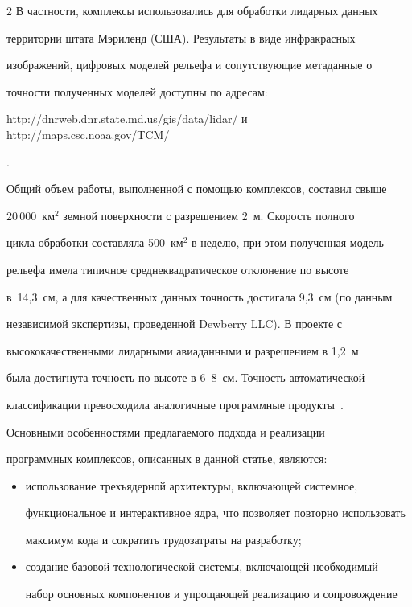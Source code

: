 \begin{multicols}{2}
   В частности, комплексы использовались для обработки лидарных данных 

территории штата Мэриленд (США). Результаты в виде инфракрасных 

изображений, цифровых моделей рель\-ефа и сопутствующие метаданные о 

точ\-ности полученных моделей доступны по адресам: {\sf 

http://dnrweb.dnr.state.md.us/gis/data/lidar/ и http://maps.csc.noaa.gov/TCM/}.



   Общий объем работы, выполненной с помощью комплексов, составил свыше 

20\,000~км$^2$ земной поверхности с разрешением 2~м. Скорость полного 

цикла обработки составляла 500~км$^2$ в неделю, при этом полученная модель 

рельефа имела типичное среднеквадратическое отклонение по высоте 

в~14,3~см, а для качественных данных точность достигала 9,3~см (по данным 

независимой экспертизы, проведенной Dewberry LLC). В проекте с 

высококачественными лидарными авиаданными и разрешением в 1,2~м 

была достигнута точность по высоте в 6--8~см. Точность автоматической 

классификации превосходила аналогичные программные продукты~\cite{11su}.



   

   Основными особенностями предлагаемого подхода и реализации 

программных комплексов, описанных в данной статье, являются:

   \begin{itemize}

\item использование трехъядерной архитектуры, включающей системное, 

функциональное и интерактивное ядра, что позволяет повторно использовать 

максимум кода и сократить трудозатраты на разработку;

\item создание базовой технологической системы, включающей необходимый 

набор основных компонентов и упрощающей реализацию и сопровождение 


\end{itemize}
\end{multicols}
